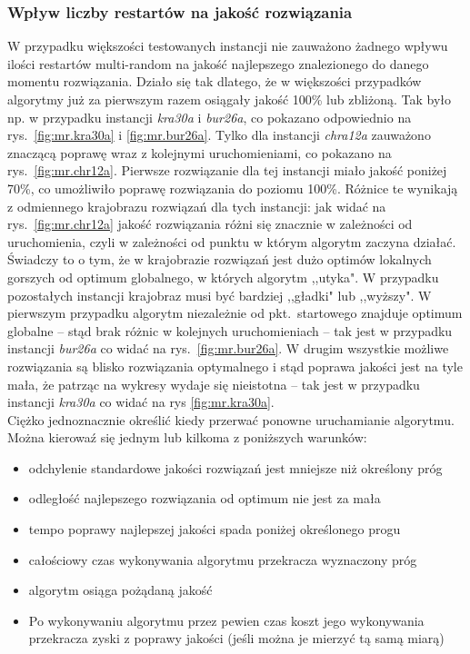 \documentclass{article}
\begin{document}
		\subsubsection{Wpływ liczby restartów na jakość rozwiązania}		
			W przypadku większości testowanych instancji nie zauważono żadnego wpływu ilości restartów multi-random na jakość najlepszego znalezionego do danego momentu rozwiązania. Działo się tak dlatego, że w większości przypadków algorytmy już za pierwszym razem osiągały jakość  100\%  lub zbliżoną. Tak było np. w przypadku instancji \emph{kra30a} i \emph{bur26a}, co pokazano odpowiednio na rys.~\ref{fig:mr.kra30a} i \ref{fig:mr.bur26a}. Tylko dla instancji \emph{chra12a} zauważono znaczącą poprawę wraz z kolejnymi uruchomieniami, co pokazano na rys.~\ref{fig:mr.chr12a}. Pierwsze rozwiązanie dla tej instancji miało jakość poniżej 70\%, co umożliwiło poprawę rozwiązania do poziomu 100\%. Różnice te wynikają z odmiennego krajobrazu rozwiązań dla tych instancji: jak widać na rys.~\ref{fig:mr.chr12a} jakość rozwiązania różni się znacznie w zależności od uruchomienia, czyli w zależności od punktu w którym algorytm zaczyna działać. Świadczy to o tym, że w krajobrazie rozwiązań jest dużo optimów lokalnych gorszych od optimum globalnego, w których algorytm ,,utyka". W przypadku pozostałych instancji krajobraz musi być bardziej ,,gładki" lub ,,wyższy". W pierwszym przypadku algorytm niezależnie od pkt.~startowego znajduje optimum globalne -- stąd brak różnic w kolejnych uruchomieniach -- tak jest w przypadku instancji \emph{bur26a} co widać na rys.~\ref{fig:mr.bur26a}. W drugim wszystkie możliwe rozwiązania są blisko rozwiązania optymalnego i stąd poprawa jakości jest na tyle mała, że patrząc na wykresy wydaje się nieistotna -- tak jest w przypadku instancji \emph{kra30a} co widać na rys \ref{fig:mr.kra30a}.
			\\Ciężko jednoznacznie określić kiedy przerwać ponowne uruchamianie algorytmu. Można kierowaź się jednym lub kilkoma z poniższych warunków:
			\begin{itemize}
				\item{odchylenie standardowe jakości rozwiązań jest mniejsze niż określony próg}
				\item{odległość najlepszego rozwiązania od optimum nie jest za mała}
				\item{tempo poprawy najlepszej jakości spada poniżej określonego progu}
				\item{całościowy czas wykonywania algorytmu przekracza wyznaczony próg}
				\item{algorytm osiąga pożądaną jakość}
				\item{Po wykonywaniu algorytmu przez pewien czas koszt jego wykonywania przekracza zyski z poprawy jakości (jeśli można je mierzyć tą samą miarą)}
			\end{itemize}
\end{document}
